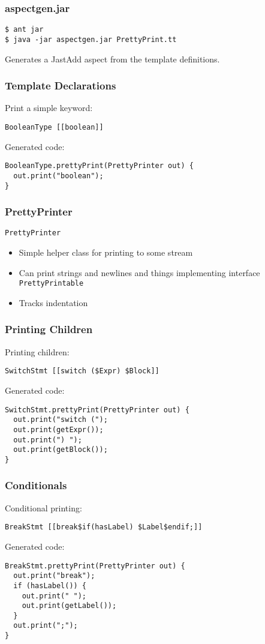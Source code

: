 \documentclass[a4paper,12pt,presentation]{beamer}
\begin{document}
\begin{frame}[fragile]
    \frametitle{aspectgen.jar}
\begin{verbatim}
$ ant jar
$ java -jar aspectgen.jar PrettyPrint.tt
\end{verbatim}

Generates a JastAdd aspect from the template definitions.
\end{frame}

\begin{frame}[fragile]
    \frametitle{Template Declarations}

    Print a simple keyword:

\begin{verbatim}
BooleanType [[boolean]]
\end{verbatim}

    Generated code:
\begin{verbatim}
BooleanType.prettyPrint(PrettyPrinter out) {
  out.print("boolean");
}
\end{verbatim}

\end{frame}

\begin{frame}[fragile]
    \frametitle{PrettyPrinter}
    \verb'PrettyPrinter'
    \begin{itemize}
        \item Simple helper class for printing to some stream
        \item Can print strings and newlines and things implementing interface \verb'PrettyPrintable'
        \item Tracks indentation
    \end{itemize}

\end{frame}

\begin{frame}[fragile]
    \frametitle{Printing Children}
    Printing children:
\begin{verbatim}
SwitchStmt [[switch ($Expr) $Block]]
\end{verbatim}

    Generated code:
\begin{verbatim}
SwitchStmt.prettyPrint(PrettyPrinter out) {
  out.print("switch (");
  out.print(getExpr());
  out.print(") ");
  out.print(getBlock());
}
\end{verbatim}
\end{frame}

\begin{frame}[fragile]
    \frametitle{Conditionals}
    Conditional printing:
\begin{verbatim}
BreakStmt [[break$if(hasLabel) $Label$endif;]]
\end{verbatim}

    Generated code:
\begin{verbatim}
BreakStmt.prettyPrint(PrettyPrinter out) {
  out.print("break");
  if (hasLabel()) {
    out.print(" ");
    out.print(getLabel());
  }
  out.print(";");
}
\end{verbatim}
\end{frame}
\end{document}
